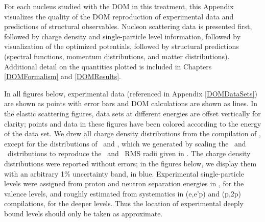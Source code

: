 For each nucleus studied with the DOM in this treatment, this Appendix
visualizes the quality of the DOM reproduction of experimental data and
predictions of structural observables. Nucleon scattering data is presented
first, followed by charge density and single-particle level information,
followed by visualization of the optimized potentials, followed by structural
predictions (spectral functions, momentum distributions, and matter
distributions). Additional detail on the quantities plotted is included in
Chapters \ref{DOMFormalism} and \ref{DOMResults}.

In all figures below, experimental data (referenced in Appendix \ref{DOMDataSets}) are shown
as points with error bars and DOM calculations are shown as lines. In
the elastic scattering figures, data sets at different energies are offset
vertically for clarity; points and data in these figures have been colored
according to the energy of the data set. We drew all charge density distributions
from the compilation of \cite{DeVries1987}, except for the distributions of
\oEight\ and \snTwelve, which we generated by scaling the \oSix\ and \snFour\
distributions to reproduce the \oEight\ and \snTwelve\ RMS radii given in
\cite{DeVries1987}. The \cite{DeVries1987} charge density distributions
were reported without
errors; in the figures below, we display them with an arbitrary 1\% uncertainty
band, in blue. Experimental
single-particle levels were assigned from proton and neutron separation energies
in \cite{AME2016}, for the valence levels,
and roughly estimated from systematics in (e,e'p) and (p,2p) compilations, for the deeper
levels. Thus the location of experimental deeply bound levels should only be
taken as approximate.

